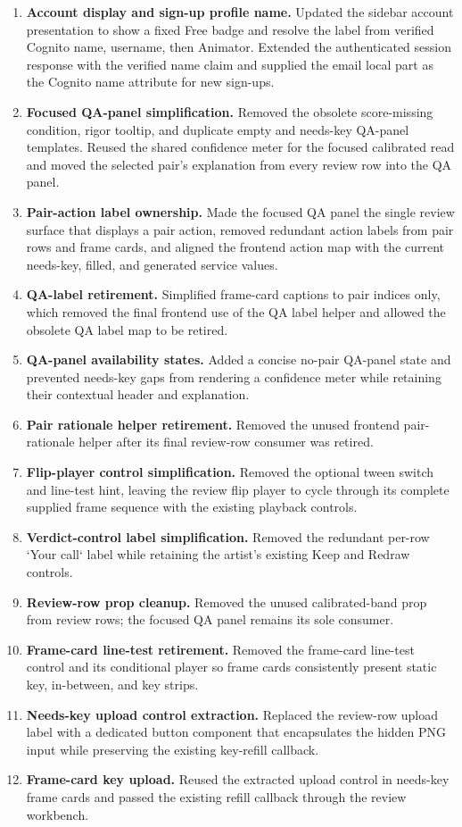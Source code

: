 \begin{enumerate}
  \item \textbf{Account display and sign-up profile name.} Updated the sidebar account presentation to show a fixed Free badge and resolve the label from verified Cognito name, username, then Animator. Extended the authenticated session response with the verified name claim and supplied the email local part as the Cognito name attribute for new sign-ups.
  \item \textbf{Focused QA-panel simplification.} Removed the obsolete score-missing condition, rigor tooltip, and duplicate empty and needs-key QA-panel templates. Reused the shared confidence meter for the focused calibrated read and moved the selected pair's explanation from every review row into the QA panel.
  \item \textbf{Pair-action label ownership.} Made the focused QA panel the single review surface that displays a pair action, removed redundant action labels from pair rows and frame cards, and aligned the frontend action map with the current needs-key, filled, and generated service values.
  \item \textbf{QA-label retirement.} Simplified frame-card captions to pair indices only, which removed the final frontend use of the QA label helper and allowed the obsolete QA label map to be retired.
  \item \textbf{QA-panel availability states.} Added a concise no-pair QA-panel state and prevented needs-key gaps from rendering a confidence meter while retaining their contextual header and explanation.
  \item \textbf{Pair rationale helper retirement.} Removed the unused frontend pair-rationale helper after its final review-row consumer was retired.
  \item \textbf{Flip-player control simplification.} Removed the optional tween switch and line-test hint, leaving the review flip player to cycle through its complete supplied frame sequence with the existing playback controls.
  \item \textbf{Verdict-control label simplification.} Removed the redundant per-row `Your call` label while retaining the artist's existing Keep and Redraw controls.
  \item \textbf{Review-row prop cleanup.} Removed the unused calibrated-band prop from review rows; the focused QA panel remains its sole consumer.
  \item \textbf{Frame-card line-test retirement.} Removed the frame-card line-test control and its conditional player so frame cards consistently present static key, in-between, and key strips.
  \item \textbf{Needs-key upload control extraction.} Replaced the review-row upload label with a dedicated button component that encapsulates the hidden PNG input while preserving the existing key-refill callback.
  \item \textbf{Frame-card key upload.} Reused the extracted upload control in needs-key frame cards and passed the existing refill callback through the review workbench.


\end{enumerate}
